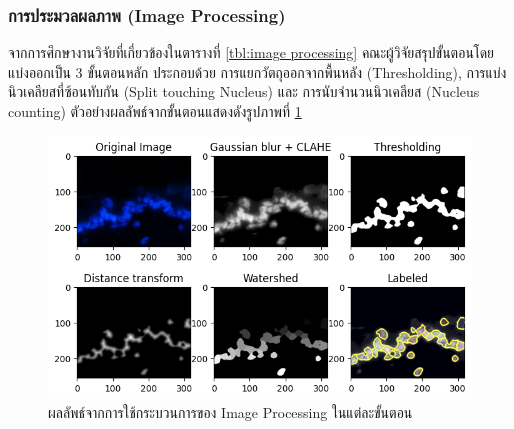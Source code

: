 \documentclass[12pt,oneside,openright,a4paper]{cpe-thai-project}
\begin{document}
\subsubsection{การประมวลผลภาพ (Image Processing)}
จากการศึกษางานวิจัยที่เกี่ยวข้องในตารางที่ \ref{tbl:image processing} คณะผู้วิจัยสรุปขั้นตอนโดยแบ่งออกเป็น 3 ขั้นตอนหลัก ประกอบด้วย การแยกวัตถุออกจากพื้นหลัง (Thresholding), การแบ่งนิวเคลียสที่ซ้อนทับกัน (Split touching Nucleus) และ การนับจำนวนนิวเคลียส (Nucleus counting) ตัวอย่างผลลัพธ์จากขั้นตอนแสดงดังรูปภาพที่ \ref{fig:imks-process}
\begin{figure}[!h]
    \centering
    \includegraphics[scale=0.6]{images/imks_process.png}
    \caption[imks-process]{ผลลัพธ์จากการใช้กระบวนการของ Image Processing ในแต่ละขั้นตอน}
    \label{fig:imks-process}
\end{figure}
\end{document}
